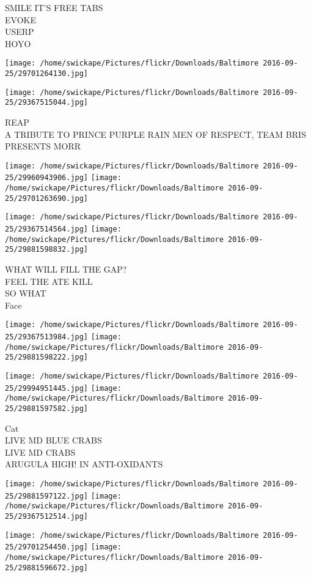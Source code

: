 \documentclass[10pt,letterpaper]{article}
\begin{document}
SMILE IT'S FREE TABS\\
EVOKE\\
USERP\\
HOYO
\pagebreak

\texttt{[image: /home/swickape/Pictures/flickr/Downloads/Baltimore 2016-09-25/29701264130.jpg]}

\vspace{0.25in}
\texttt{[image: /home/swickape/Pictures/flickr/Downloads/Baltimore 2016-09-25/29367515044.jpg]}

REAP\\
A TRIBUTE TO PRINCE PURPLE RAIN MEN OF RESPECT, TEAM BRIS PRESENTS MORR
\pagebreak

\texttt{[image: /home/swickape/Pictures/flickr/Downloads/Baltimore 2016-09-25/29960943906.jpg]}
\texttt{[image: /home/swickape/Pictures/flickr/Downloads/Baltimore 2016-09-25/29701263690.jpg]}

\texttt{[image: /home/swickape/Pictures/flickr/Downloads/Baltimore 2016-09-25/29367514564.jpg]}
\texttt{[image: /home/swickape/Pictures/flickr/Downloads/Baltimore 2016-09-25/29881598832.jpg]}

WHAT WILL FILL THE GAP?\\
FEEL THE ATE KILL\\
SO WHAT\\
Face
\pagebreak

\texttt{[image: /home/swickape/Pictures/flickr/Downloads/Baltimore 2016-09-25/29367513984.jpg]}
\texttt{[image: /home/swickape/Pictures/flickr/Downloads/Baltimore 2016-09-25/29881598222.jpg]}

\texttt{[image: /home/swickape/Pictures/flickr/Downloads/Baltimore 2016-09-25/29994951445.jpg]}
\texttt{[image: /home/swickape/Pictures/flickr/Downloads/Baltimore 2016-09-25/29881597582.jpg]}

Cat\\
LIVE MD BLUE CRABS\\
LIVE MD CRABS\\
ARUGULA HIGH! IN ANTI{-}OXIDANTS
\pagebreak

\texttt{[image: /home/swickape/Pictures/flickr/Downloads/Baltimore 2016-09-25/29881597122.jpg]}
\texttt{[image: /home/swickape/Pictures/flickr/Downloads/Baltimore 2016-09-25/29367512514.jpg]}

\texttt{[image: /home/swickape/Pictures/flickr/Downloads/Baltimore 2016-09-25/29701254450.jpg]}
\texttt{[image: /home/swickape/Pictures/flickr/Downloads/Baltimore 2016-09-25/29881596672.jpg]}
\end{document}
